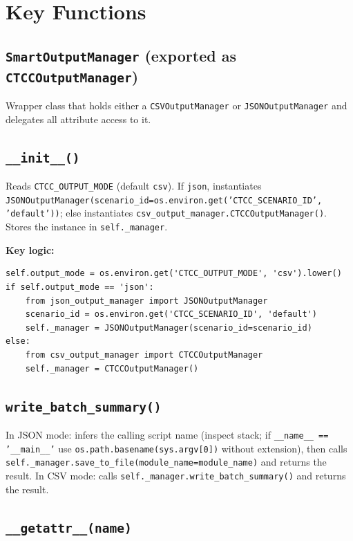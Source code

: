 \documentclass[ctcc_full_documentation.tex]{subfiles}
\begin{document}
\section{Key Functions}

\subsection{\texttt{SmartOutputManager} (exported as \texttt{CTCCOutputManager})}

Wrapper class that holds either a \texttt{CSVOutputManager} or \texttt{JSONOutputManager} and delegates all attribute access to it.

\subsection{\texttt{\_\_init\_\_()}}

Reads \texttt{CTCC\_OUTPUT\_MODE} (default \texttt{csv}). If \texttt{json}, instantiates \texttt{JSONOutputManager(scenario\_id=os.environ.get('CTCC\_SCENARIO\_ID', 'default'))}; else instantiates \texttt{csv\_output\_manager.CTCCOutputManager()}. Stores the instance in \texttt{self.\_manager}.

\textbf{Key logic:}
\begin{lstlisting}
self.output_mode = os.environ.get('CTCC_OUTPUT_MODE', 'csv').lower()
if self.output_mode == 'json':
    from json_output_manager import JSONOutputManager
    scenario_id = os.environ.get('CTCC_SCENARIO_ID', 'default')
    self._manager = JSONOutputManager(scenario_id=scenario_id)
else:
    from csv_output_manager import CTCCOutputManager
    self._manager = CTCCOutputManager()
\end{lstlisting}

\subsection{\texttt{write\_batch\_summary()}}

In JSON mode: infers the calling script name (inspect stack; if \texttt{\_\_name\_\_ == '\_\_main\_\_'} use \texttt{os.path.basename(sys.argv[0])} without extension), then calls \texttt{self.\_manager.save\_to\_file(module\_name=module\_name)} and returns the result. In CSV mode: calls \texttt{self.\_manager.write\_batch\_summary()} and returns the result.

\subsection{\texttt{\_\_getattr\_\_(name)}}
\end{document}
